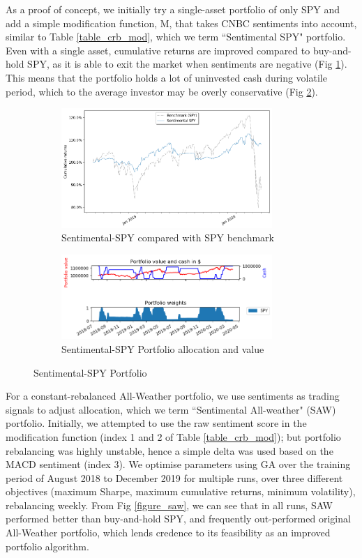 \documentclass{article}
\begin{document}
As a proof of concept, we initially try a single-asset portfolio of only SPY and add a simple modification function, M, that takes CNBC sentiments into account, similar to Table \ref{table_crb_mod}, which we term ``Sentimental SPY" portfolio. Even with a single asset, cumulative returns are improved compared to buy-and-hold SPY, as it is able to exit the market when sentiments are negative (Fig \ref{figure_sspy_vs_spy}). This means that the portfolio holds a lot of uninvested cash during volatile period, which to the average investor may be overly conservative (Fig \ref{figure_sspy_allocation}).


\begin{figure}[tbh]
\begin{subfigure}[t]{8cm}
    \includegraphics[width=8cm]{figure_benchmark_spy.png}
    \caption{Sentimental-SPY compared with SPY benchmark \label{figure_sspy_vs_spy}}
\end{subfigure}
\begin{subfigure}[t]{8cm}
    \includegraphics[width=8cm]{figure_analyse_sent_spy.png}
    \caption{Sentimental-SPY Portfolio allocation and value \label{figure_sspy_allocation}}
\end{subfigure}
\caption{Sentimental-SPY Portfolio \label{figure_sspy}}
\end{figure}

For a constant-rebalanced All-Weather portfolio, we use sentiments as trading signals to adjust allocation, which we term ``Sentimental All-weather" (SAW) portfolio. Initially, we attempted to use the raw sentiment score in the modification function (index 1 and 2 of Table \ref{table_crb_mod}); but portfolio rebalancing was highly unstable, hence a simple delta was used based on the MACD sentiment (index 3). We optimise parameters using GA over the training period of August 2018 to December 2019 for multiple runs, over three different objectives (maximum Sharpe, maximum cumulative returns, minimum volatility), rebalancing weekly. From Fig \ref{figure_saw}, we can see that in all runs, SAW performed better than buy-and-hold SPY, and frequently out-performed original All-Weather portfolio, which lends credence to its feasibility as an improved portfolio algorithm.
\end{document}
